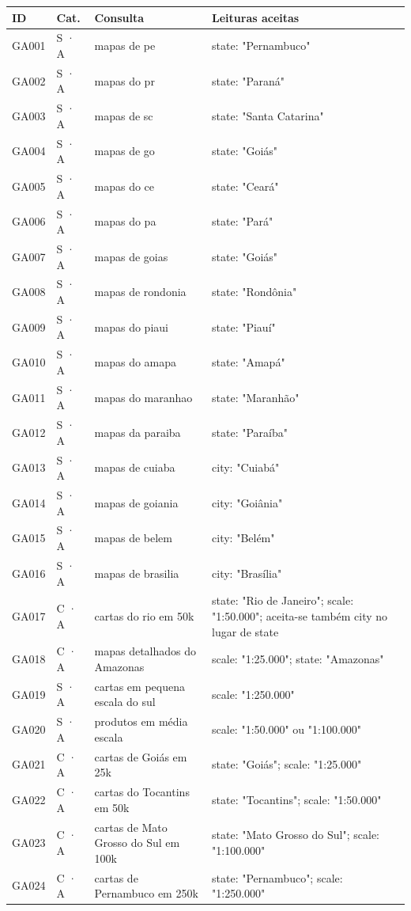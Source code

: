 {\footnotesize
\begin{longtable}{|p{1.1cm}|p{1.3cm}|p{5.4cm}|p{6.3cm}|}
\hline
\textbf{ID} & \textbf{Cat.} & \textbf{Consulta} & \textbf{Leituras aceitas} \\ \hline
\endhead
GA001 & S · A & mapas de pe & state: "Pernambuco" \\ \hline
GA002 & S · A & mapas do pr & state: "Paraná" \\ \hline
GA003 & S · A & mapas de sc & state: "Santa Catarina" \\ \hline
GA004 & S · A & mapas de go & state: "Goiás" \\ \hline
GA005 & S · A & mapas do ce & state: "Ceará" \\ \hline
GA006 & S · A & mapas do pa & state: "Pará" \\ \hline
GA007 & S · A & mapas de goias & state: "Goiás" \\ \hline
GA008 & S · A & mapas de rondonia & state: "Rondônia" \\ \hline
GA009 & S · A & mapas do piaui & state: "Piauí" \\ \hline
GA010 & S · A & mapas do amapa & state: "Amapá" \\ \hline
GA011 & S · A & mapas do maranhao & state: "Maranhão" \\ \hline
GA012 & S · A & mapas da paraiba & state: "Paraíba" \\ \hline
GA013 & S · A & mapas de cuiaba & city: "Cuiabá" \\ \hline
GA014 & S · A & mapas de goiania & city: "Goiânia" \\ \hline
GA015 & S · A & mapas de belem & city: "Belém" \\ \hline
GA016 & S · A & mapas de brasilia & city: "Brasília" \\ \hline
GA017 & C · A & cartas do rio em 50k & state: "Rio de Janeiro"; scale: "1:50.000"; aceita-se também city no lugar de state \\ \hline
GA018 & C · A & mapas detalhados do Amazonas & scale: "1:25.000"; state: "Amazonas" \\ \hline
GA019 & S · A & cartas em pequena escala do sul & scale: "1:250.000" \\ \hline
GA020 & S · A & produtos em média escala & scale: "1:50.000" ou "1:100.000" \\ \hline
GA021 & C · A & cartas de Goiás em 25k & state: "Goiás"; scale: "1:25.000" \\ \hline
GA022 & C · A & cartas do Tocantins em 50k & state: "Tocantins"; scale: "1:50.000" \\ \hline
GA023 & C · A & cartas de Mato Grosso do Sul em 100k & state: "Mato Grosso do Sul"; scale: "1:100.000" \\ \hline
GA024 & C · A & cartas de Pernambuco em 250k & state: "Pernambuco"; scale: "1:250.000" \\ \hline
\end{longtable}
\addtocounter{table}{-1}
}

